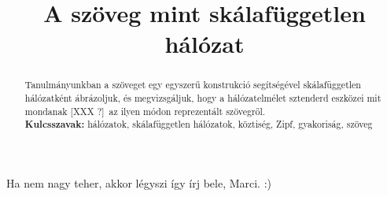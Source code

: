 \documentclass{llncs}
\newcommand{\XXX}[1]{{\small \color{megjcolor} [XXX #1]}}
\newcommand{\XXXk}{\XXX{?}\ }
\newcommand{\marci}[1]{{\color{marcicolor} #1}}
\begin{document}


\title{A szöveg mint skálafüggetlen hálózat}
\author{\institute{}}
\maketitle


\begin{abstract}
Tanulmányunkban a szöveget egy egyszerű konstrukció segítségével
skálafüggetlen hálózatként ábrázoljuk,
és megvizsgáljuk, hogy a hálózatelmélet sztenderd eszközei
mit mondanak \XXXk az ilyen módon reprezentált szövegről.
\\{\bf Kulcsszavak:} hálózatok, skálafüggetlen hálózatok, köztiség, Zipf, gyakoriság, szöveg
\end{abstract}


 
% 
%
%
%
%
%
%

\marci{Ha nem nagy teher, akkor légyszi így írj bele, Marci. :)}

\end{document}
